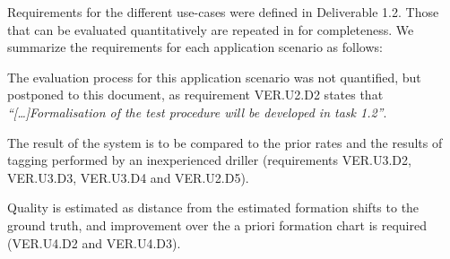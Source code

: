 \ede
Requirements for the different use-cases were defined in Deliverable 1.2. Those that can be evaluated quantitatively are repeated in  for completeness.
We summarize the  requirements for each application scenario as follows:
\bde
\item[VER1:] The evaluation process for this application scenario was not quantified, but postponed to this document, as requirement VER.U2.D2 states that \textit{``[\ldots]Formalisation of the test procedure will be developed in task 1.2''}.
\item[VER2:] The result of the system is to be compared to the prior rates and the results of tagging performed by an inexperienced driller (requirements VER.U3.D2, VER.U3.D3, VER.U3.D4 and VER.U2.D5).
\item[VER3:] Quality is estimated as distance from the estimated formation shifts to the ground truth, and improvement over the a priori formation chart is required (VER.U4.D2 and VER.U4.D3).
\ede

